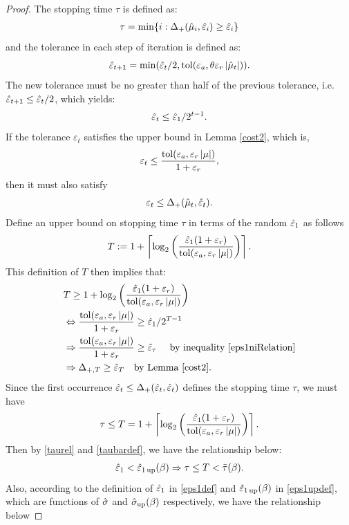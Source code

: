 \documentclass{iitthesis}
\theoremstyle{definition}
\begin{document}
\begin{proof}
The stopping time $\tau$ is defined as:
 \begin{align}\label{st}
\tau = \min \{ i: \Delta_{+}(\hat{\mu}_i, \hat{\varepsilon}_i) \geq \hat{\varepsilon}_i \}
\end{align}
 and the tolerance in each step of iteration is defined as:
 $$\hat{\varepsilon}_{t+1} = \min(\hat{\varepsilon}_t/2, \operatorname{tol}(\varepsilon_a,\theta\varepsilon_r\left \lvert \hat{\mu}_t \right \rvert)).$$ 
The new tolerance must be no greater than half of the previous tolerance, i.e. $\hat{\varepsilon}_{t+1} \leq\hat{\varepsilon}_t/2$, which yields: 
\begin{align}\label{eps1niRelation}
\hat{\varepsilon}_t\le\hat{\varepsilon}_1/2^{t-1}.
\end{align} 
If the tolerance $\varepsilon_t$ satisfies the upper bound in Lemma \ref{cost2}, which is, $$\varepsilon_t \leq \frac{\operatorname{tol}(\varepsilon_a, \varepsilon_r\left \lvert \mu \right \rvert)}{1+\varepsilon_r},$$ then it must also satisfy
$$\varepsilon_t \leq \Delta_{+}(\hat{\mu}_t, \hat{\varepsilon}_t).$$ 
Define an upper bound on stopping time $\tau$ in terms of the random $\hat{\varepsilon}_1$ as follows
$$T := 1+\left \lceil \log_{2} \left(\frac{\hat{\varepsilon}_{1}(1+\varepsilon_r)}{ \operatorname{tol}(\varepsilon_a,\varepsilon_r \left \lvert \mu \right \rvert)}\right) \right \rceil. $$
This definition of $T$ then implies that:
\begin{align*}
& T \geq 1+\log_{2} \left(\frac{\hat{\varepsilon}_{1}(1+\varepsilon_r)}{ \operatorname{tol}(\varepsilon_a,\varepsilon_r \left \lvert \mu \right \rvert)}\right)\\&
\Leftrightarrow  \frac{\operatorname{tol}(\varepsilon_a, \varepsilon_r\left \lvert \mu \right \rvert)}{1+\varepsilon_r} \ge \hat{\varepsilon}_1/2^{T-1}\\
& \Rightarrow \frac{\operatorname{tol}(\varepsilon_a, \varepsilon_r\left \lvert \mu \right \rvert)}{1+\varepsilon_r} \ge \hat{\varepsilon}_\tau  \text{ \quad by inequality \eqref{eps1niRelation}}\\&
\Rightarrow \Delta_{+,T} \ge \hat{\varepsilon}_{T} \text{\quad by Lemma \ref{cost2}}.
\end{align*}
Since the first occurrence $\hat{\varepsilon}_t \leq \Delta_+(\hat{\varepsilon}_t,\hat{\varepsilon}_t)$ defines the stopping time $\tau$, we must have
\begin{align}\label{taurel}
\tau \le T= 1+\left \lceil \log_{2} \left(\frac{\hat{\varepsilon}_{1}(1+\varepsilon_r)}{ \operatorname{tol}(\varepsilon_a,\varepsilon_r \left \lvert \mu \right \rvert)}\right) \right \rceil.
\end{align}
Then by \eqref{taurel} and \eqref{taubardef}, we have the relationship below:
\begin{align} \label{epstau}
 \hat{\varepsilon}_1 <\hat{\varepsilon}_{1\operatorname{up}}(\beta) \Rightarrow \tau \le T<\bar{\tau}(\beta).
\end{align}
Also, according to the definition of $\hat{\varepsilon}_1$ in \eqref{eps1def} and $\hat{\varepsilon}_{1\operatorname{up}}(\beta)$ in \eqref{eps1updef}, which are functions of $\hat{\sigma}$ and $\hat{\sigma}_{\operatorname{up}}(\beta)$ respectively, we have the relationship below

\end{proof}
\end{document}

